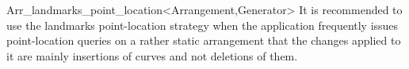 \begin{ccRefClass}{Arr_landmarks_point_location<Arrangement,Generator>}
It is recommended to use the landmarks point-location strategy
when the application frequently issues point-location queries on a
rather static arrangement that the changes applied to it are mainly
insertions of curves and not deletions of them.


\ccIsModel
\\

\ccSeeAlso
\\
\\
\\

\end{ccRefClass}

\ccRefPageEnd
